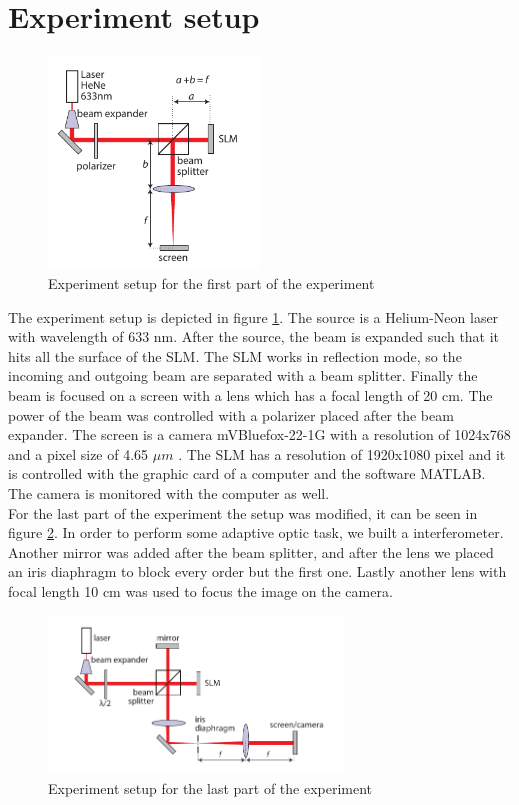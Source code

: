 \documentclass[a4paper,10pt]{article}
\begin{document}
\section{Experiment setup}\label{setupsection}
\begin{figure}[H]
\centering
\includegraphics[width=0.5\textwidth]{setup1}
\caption{Experiment setup for the first part of the experiment}\label{setup1}
\end{figure}
The experiment setup is depicted in figure \ref{setup1}. The source is a Helium-Neon laser with wavelength of 633 nm. After the source, the beam is expanded such that it hits all the surface of the SLM. The SLM works in reflection mode, so the incoming and outgoing beam are separated with a beam splitter. Finally the beam is focused on a screen with a lens which has a focal length of 20 cm. The power of the beam was controlled with a polarizer placed after the beam expander. The screen is a camera mVBluefox-22-1G with a resolution of 1024x768 and a pixel size of 4.65 $\mu m$ \cite{camerasite}. The SLM has a resolution of 1920x1080 pixel and it is controlled with the graphic card of a computer and the software MATLAB. The camera is monitored with the computer as well.\\
For the last part of the experiment the setup was modified, it can be seen in figure \ref{setup2}. In order to perform some adaptive optic task, we built a interferometer. Another mirror was added after the beam splitter, and after the lens we placed an iris diaphragm to block every order but the first one. Lastly another lens with focal length 10 cm was used to focus the image on the camera.
\begin{figure}[H]
\centering
\includegraphics[width=0.7\textwidth]{setup2}
\caption{Experiment setup for the last part of the experiment}\label{setup2}
\end{figure}
\end{document}
